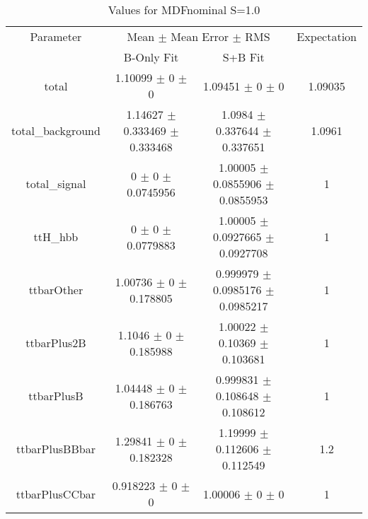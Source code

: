 \begin{table}
\centering
\caption{Values for MDFnominal S=1.0}
\begin{tabular}{cccc}
\toprule
Parameter & \multicolumn{2}{c}{Mean $\pm$ Mean Error $\pm$ RMS} & Expectation\\
 & B-Only Fit & S+B Fit & \\
\midrule
total & \num{1.10099} $\pm$ \num{0} $\pm$ \num{0} & \num{1.09451} $\pm$ \num{0} $\pm$ \num{0} & \num{1.09035}\\
total\_background & \num{1.14627} $\pm$ \num{0.333469} $\pm$ \num{0.333468} & \num{1.0984} $\pm$ \num{0.337644} $\pm$ \num{0.337651} & \num{1.0961}\\
total\_signal & \num{0} $\pm$ \num{0} $\pm$ \num{0.0745956} & \num{1.00005} $\pm$ \num{0.0855906} $\pm$ \num{0.0855953} & \num{1}\\
ttH\_hbb & \num{0} $\pm$ \num{0} $\pm$ \num{0.0779883} & \num{1.00005} $\pm$ \num{0.0927665} $\pm$ \num{0.0927708} & \num{1}\\
ttbarOther & \num{1.00736} $\pm$ \num{0} $\pm$ \num{0.178805} & \num{0.999979} $\pm$ \num{0.0985176} $\pm$ \num{0.0985217} & \num{1}\\
ttbarPlus2B & \num{1.1046} $\pm$ \num{0} $\pm$ \num{0.185988} & \num{1.00022} $\pm$ \num{0.10369} $\pm$ \num{0.103681} & \num{1}\\
ttbarPlusB & \num{1.04448} $\pm$ \num{0} $\pm$ \num{0.186763} & \num{0.999831} $\pm$ \num{0.108648} $\pm$ \num{0.108612} & \num{1}\\
ttbarPlusBBbar & \num{1.29841} $\pm$ \num{0} $\pm$ \num{0.182328} & \num{1.19999} $\pm$ \num{0.112606} $\pm$ \num{0.112549} & \num{1.2}\\
ttbarPlusCCbar & \num{0.918223} $\pm$ \num{0} $\pm$ \num{0} & \num{1.00006} $\pm$ \num{0} $\pm$ \num{0} & \num{1}\\
\bottomrule
\end{tabular}
\end{table}